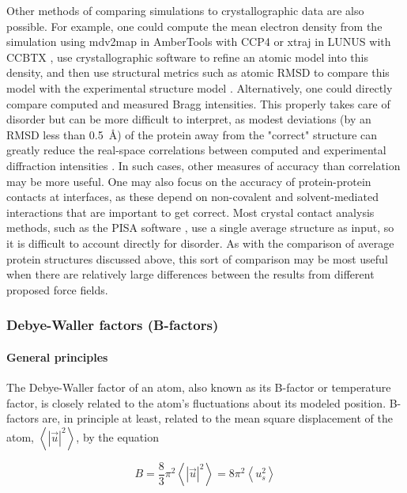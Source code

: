 \documentclass[9pt,review,pubversion]{livecoms}
\begin{document}
Other methods of comparing simulations to crystallographic data are also possible.
For example, one could compute the mean electron density from the simulation using mdv2map in AmberTools with CCP4 \cite{winn_overview_2011,case_amber_2022} or xtraj in LUNUS with CCBTX \cite{grosse-kunstleve_computational_2002,wall_methods_2009}, use crystallographic software to refine an atomic model into this density, and then use structural metrics such as atomic RMSD to compare this model with the experimental structure model \cite{wych_molecular-dynamics_2023}.
Alternatively, one could directly compare computed and measured Bragg intensities.
This properly takes care of disorder but can be more difficult to interpret, as modest deviations (by an RMSD less than \qty{0.5}{\angstrom}) of the protein away from the "correct" structure can greatly reduce the real-space correlations between computed and experimental diffraction intensities \cite{wall_internal_2018}.
In such cases, other measures of accuracy than correlation may be more useful.
One may also focus on the accuracy of protein-protein contacts at interfaces, as these depend on non-covalent and solvent-mediated interactions that are important to get correct.
Most crystal contact analysis methods, such as the PISA software \cite{krissinel_inference_2007}, use a single average structure as input, so it is difficult to account directly for disorder.
As with the comparison of average protein structures discussed above, this sort of comparison may be most useful when there are relatively large differences between the results from different proposed force fields.

\newpage
\subsubsection{Debye-Waller factors (B-factors)}
\label{sub2:b_factors}

\paragraph{General principles}

The Debye-Waller factor of an atom, also known as its B-factor or temperature factor, is closely related to the atom’s fluctuations about its modeled position.
B-factors are, in principle at least, related to the mean square displacement of the atom, $\left\langle \left| \vec{u} \right|^2 \right\rangle$, by the equation

\begin{equation}
\label{eqn:b_factor}
B = \frac {8} {3} \pi^2 \left\langle \left| \vec{u} \right|^2 \right\rangle = 8 \pi^2 \left\langle u_s^2 \right\rangle
\end{equation}
\end{document}

